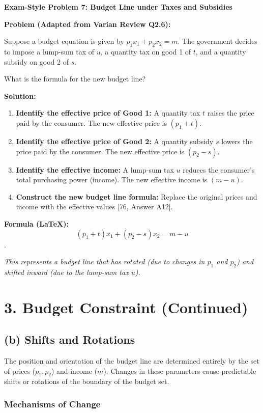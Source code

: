 \documentclass{article}
\begin{document}
\textbf{Exam-Style Problem 7: Budget Line under Taxes and Subsidies}

\textbf{Problem (Adapted from Varian Review Q2.6):}

Suppose a budget equation is given by $p_1x_1 + p_2x_2 = m$. The government decides to impose a lump-sum tax of $u$, a quantity tax on good 1 of $t$, and a quantity subsidy on good 2 of $s$.

What is the formula for the new budget line?

\textbf{Solution:}

\begin{enumerate}
    \item \textbf{Identify the effective price of Good 1:} A quantity tax $t$ raises the price paid by the consumer. The new effective price is $(p_1 + t)$.
    \item \textbf{Identify the effective price of Good 2:} A quantity subsidy $s$ lowers the price paid by the consumer. The new effective price is $(p_2 - s)$.
    \item \textbf{Identify the effective income:} A lump-sum tax $u$ reduces the consumer's total purchasing power (income). The new effective income is $(m - u)$.
    \item \textbf{Construct the new budget line formula:} Replace the original prices and income with the effective values [76, Answer A12].
\end{enumerate}

\textbf{Formula (LaTeX):} $$(p_1 + t)x_1 + (p_2 - s)x_2 = m - u$$.

\textit{This represents a budget line that has rotated (due to changes in $p_1$ and $p_2$) and shifted inward (due to the lump-sum tax $u$).}

\hrulefill

\section*{3. Budget Constraint (Continued)}
\subsection*{(b) Shifts and Rotations}

The position and orientation of the budget line are determined entirely by the set of prices ($p_1, p_2$) and income ($m$). Changes in these parameters cause predictable shifts or rotations of the boundary of the budget set.

\subsubsection*{Mechanisms of Change}
\end{document}
